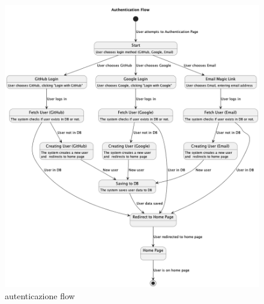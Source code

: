 \documentclass{article}
\begin{document}
    \begin{figure}[h]
        \lefting
        \includegraphics[width=1.3\textwidth]{authentication_flow}
        \caption{autenticazione flow}
        \label{fig:figure4}
    \end{figure}
\end{document}
